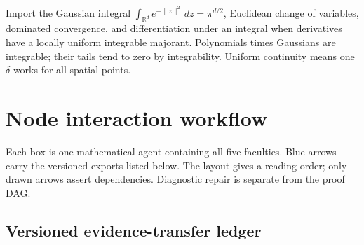 \documentclass[preprint,12pt,aps,pra,showkeys,amsmath,amssymb,superscriptaddress,floatfix]{revtex4-2}
\theoremstyle{definition}
\theoremstyle{remark}
\begin{document}
Import the Gaussian integral
\(\int_{\mathbb R^d}e^{-\|z\|^2}\,dz=\pi^{d/2}\), Euclidean change of
variables, dominated convergence, and differentiation under an integral
when derivatives have a locally uniform integrable majorant. Polynomials
times Gaussians are integrable; their tails tend to zero by
integrability. Uniform continuity means one \(\delta\) works for all
spatial points.

\clearpage\section{Node interaction workflow}

\begin{center}\end{center}

Each box is one mathematical agent containing all five faculties. Blue
arrows carry the versioned exports listed below. The layout gives a
reading order; only drawn arrows assert dependencies. Diagnostic repair
is separate from the proof DAG.

\subsection{Versioned evidence-transfer ledger}
\end{document}
